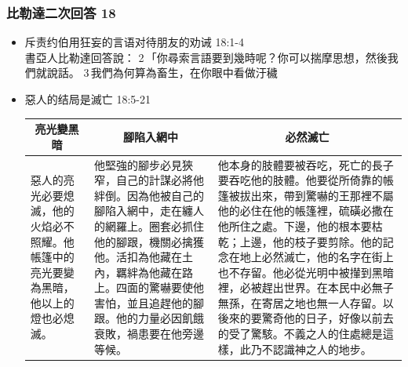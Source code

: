 \subsubsection{比勒達二次回答 18}
\begin{itemize}
\itemsep-.45em 
\item 斥责约伯用狂妄的言语对待朋友的劝诫 18:1-4\\
書亞人比勒達回答說： 2 「你尋索言語要到幾時呢？你可以揣摩思想，然後我們就說話。 3 我們為何算為畜生，在你眼中看做汙穢
\item 惡人的结局是滅亡 18:5-21\\
\begin{table}[H]
\centering 
\begin{tabular}{p{5.5em}|p{15.5em}|p{}}    \toprule
\multicolumn{1}{c|}{亮光變黑暗}&\multicolumn{1}{c|}{腳陷入網中}&\multicolumn{1}{c}{必然滅亡}\\\hline
惡人的亮光必要熄滅，他的火焰必不照耀。他帳篷中的亮光要變為黑暗，他以上的燈也必熄滅。
&他堅強的腳步必見狹窄，自己的計謀必將他絆倒。因為他被自己的腳陷入網中，走在纏人的網羅上。圈套必抓住他的腳跟，機關必擒獲他。活扣為他藏在土內，羈絆為他藏在路上。四面的驚嚇要使他害怕，並且追趕他的腳跟。他的力量必因飢餓衰敗，禍患要在他旁邊等候。&他本身的肢體要被吞吃，死亡的長子要吞吃他的肢體。他要從所倚靠的帳篷被拔出來，帶到驚嚇的王那裡不屬他的必住在他的帳篷裡，硫磺必撒在他所住之處。下邊，他的根本要枯乾；上邊，他的枝子要剪除。他的記念在地上必然滅亡，他的名字在街上也不存留。他必從光明中被攆到黑暗裡，必被趕出世界。在本民中必無子無孫，在寄居之地也無一人存留。以後來的要驚奇他的日子，好像以前去的受了驚駭。不義之人的住處總是這樣，此乃不認識神之人的地步。\\ \bottomrule
\end{tabular} 
\end{table}
\end{itemize}


